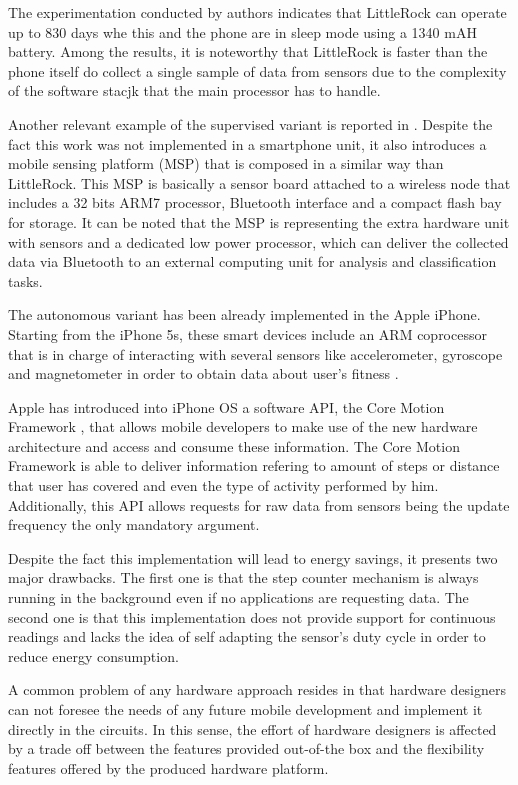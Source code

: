 The experimentation conducted by authors indicates that LittleRock can operate up to 830 days whe this and the phone are in sleep mode using a 1340 mAH battery.
Among the results, it is noteworthy that LittleRock is faster than the phone itself do collect a single sample of data from sensors due to the complexity of the software stacjk that the main processor has to handle.

Another relevant example of the supervised variant is reported in \cite{Choudhury2008}.
Despite the fact this work was not implemented in a smartphone unit, it also introduces a mobile sensing platform (MSP) that is composed in a similar way than LittleRock.
This MSP is basically a sensor board attached to a wireless node that includes a 32 bits ARM7 processor, Bluetooth interface and a compact flash bay for storage.
It can be noted that the MSP is representing the extra hardware unit with sensors and a dedicated low power processor, which can deliver the collected data via Bluetooth to an external computing unit for analysis and classification tasks.

The autonomous variant has been already implemented in the Apple iPhone.
Starting from the iPhone 5s, these smart devices include an ARM coprocessor that is in charge of interacting with several sensors like accelerometer, gyroscope and magnetometer in order to obtain data about user's fitness \cite{Sathiah2013}.

Apple has introduced into iPhone OS a software API, the Core Motion Framework \cite{Apple2013}, that allows mobile developers to make use of the new hardware architecture and access and consume these information.
The Core Motion Framework is able to deliver information refering to amount of steps or distance that user has covered and even the type of activity performed by him.
Additionally, this API allows requests for raw data from sensors being the update frequency the only mandatory argument.

Despite the fact this implementation will lead to energy savings, it presents two major drawbacks.
The first one is that the step counter mechanism is always running in the background even if no applications are requesting data.
The second one is that this implementation does not provide support for continuous readings and lacks the idea of self adapting the sensor's duty cycle in order to reduce energy consumption.

A common problem of any hardware approach resides in that hardware designers can not foresee the needs of any future mobile development and implement it directly in the circuits.
In this sense, the effort of hardware designers is affected by a trade off between the features provided out-of-the box and the flexibility features offered by the produced hardware platform.

